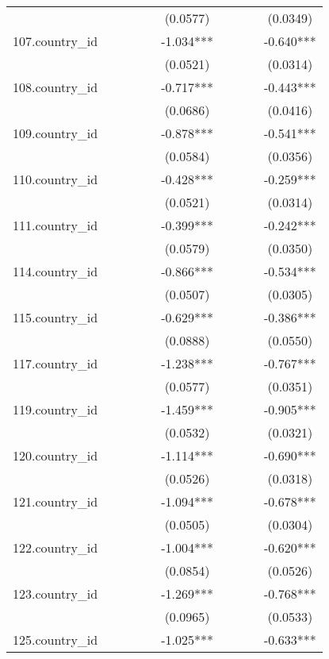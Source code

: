 \documentclass[]{article}
\begin{document}
\begin{tabular}{lccccccccc}
 &  &  &  &  & (0.0577) &  &  &  & (0.0349) \\
107.country\_id &  &  &  &  & -1.034*** &  &  &  & -0.640*** \\
 &  &  &  &  & (0.0521) &  &  &  & (0.0314) \\
108.country\_id &  &  &  &  & -0.717*** &  &  &  & -0.443*** \\
 &  &  &  &  & (0.0686) &  &  &  & (0.0416) \\
109.country\_id &  &  &  &  & -0.878*** &  &  &  & -0.541*** \\
 &  &  &  &  & (0.0584) &  &  &  & (0.0356) \\
110.country\_id &  &  &  &  & -0.428*** &  &  &  & -0.259*** \\
 &  &  &  &  & (0.0521) &  &  &  & (0.0314) \\
111.country\_id &  &  &  &  & -0.399*** &  &  &  & -0.242*** \\
 &  &  &  &  & (0.0579) &  &  &  & (0.0350) \\
114.country\_id &  &  &  &  & -0.866*** &  &  &  & -0.534*** \\
 &  &  &  &  & (0.0507) &  &  &  & (0.0305) \\
115.country\_id &  &  &  &  & -0.629*** &  &  &  & -0.386*** \\
 &  &  &  &  & (0.0888) &  &  &  & (0.0550) \\
117.country\_id &  &  &  &  & -1.238*** &  &  &  & -0.767*** \\
 &  &  &  &  & (0.0577) &  &  &  & (0.0351) \\
119.country\_id &  &  &  &  & -1.459*** &  &  &  & -0.905*** \\
 &  &  &  &  & (0.0532) &  &  &  & (0.0321) \\
120.country\_id &  &  &  &  & -1.114*** &  &  &  & -0.690*** \\
 &  &  &  &  & (0.0526) &  &  &  & (0.0318) \\
121.country\_id &  &  &  &  & -1.094*** &  &  &  & -0.678*** \\
 &  &  &  &  & (0.0505) &  &  &  & (0.0304) \\
122.country\_id &  &  &  &  & -1.004*** &  &  &  & -0.620*** \\
 &  &  &  &  & (0.0854) &  &  &  & (0.0526) \\
123.country\_id &  &  &  &  & -1.269*** &  &  &  & -0.768*** \\
 &  &  &  &  & (0.0965) &  &  &  & (0.0533) \\
125.country\_id &  &  &  &  & -1.025*** &  &  &  & -0.633*** \\

\end{tabular}
\end{document}

